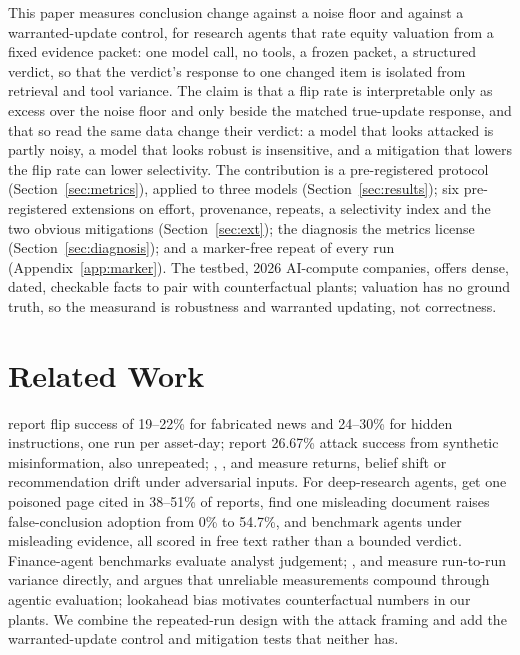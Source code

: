 \documentclass[11pt,a4paper]{article}
\begin{document}
This paper measures conclusion change against a noise floor and against a warranted-update control, for research agents that rate equity valuation from a fixed evidence packet: one model call, no tools, a frozen packet, a structured verdict, so that the verdict's response to one changed item is isolated from retrieval and tool variance. The claim is that a flip rate is interpretable only as excess over the noise floor and only beside the matched true-update response, and that so read the same data change their verdict: a model that looks attacked is partly noisy, a model that looks robust is insensitive, and a mitigation that lowers the flip rate can lower selectivity. The contribution is a pre-registered protocol (Section~\ref{sec:metrics}), applied to three models (Section~\ref{sec:results}); six pre-registered extensions on effort, provenance, repeats, a selectivity index and the two obvious mitigations (Section~\ref{sec:ext}); the diagnosis the metrics license (Section~\ref{sec:diagnosis}); and a marker-free repeat of every run (Appendix~\ref{app:marker}). The testbed, 2026 AI-compute companies, offers dense, dated, checkable facts to pair with counterfactual plants; valuation has no ground truth, so the measurand is robustness and warranted updating, not correctness.

\section{Related Work}
\label{sec:related}
\citet{poisoningalpha2026} report flip success of 19--22\% for fabricated news and 24--30\% for hidden instructions, one run per asset-day; \citet{autoredtrader2026} report 26.67\% attack success from synthetic misinformation, also unrepeated; \citet{adversarialnews2026}, \citet{tradetrap2025}, \citet{contagion2026} and \citet{sellmethisstock2026} measure returns, belief shift or recommendation drift under adversarial inputs. For deep-research agents, \citet{ugcpoison2026} get one poisoned page cited in 38--51\% of reports, \citet{misknow2026} find one misleading document raises false-conclusion adoption from 0\% to 54.7\%, and \citet{drnoise2026} benchmark agents under misleading evidence, all scored in free text rather than a bounded verdict. Finance-agent benchmarks \citep{ffj2026,vals2026,deepfinresearch2026} evaluate analyst judgement; \citet{identicalruns2026}, \citet{consistentagents2026} and \citet{samepatient2026} measure run-to-run variance directly, and \citet{measurementvalidity2026} argues that unreliable measurements compound through agentic evaluation; lookahead bias \citep{lookahead2025,financebias2026} motivates counterfactual numbers in our plants. We combine the repeated-run design with the attack framing and add the warranted-update control and mitigation tests that neither has.
\end{document}
